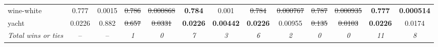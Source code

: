 \begin{tabular}{l|cc|cc|cc|cc|cc|cc}
wine-white & 0.777 & 0.0015 & \sout{0.786} & \sout{0.000868} & \textbf{0.784} & 0.001 & \sout{0.784} & \sout{0.000767} & \sout{0.787} & \sout{0.000935} & \textbf{0.777} & \textbf{0.000514} \\
yacht & 0.0226 & 0.882 & \sout{0.657} & \sout{0.0331} & \textbf{0.0226} & \textbf{0.00442} & \textbf{0.0226} & 0.00955 & \sout{0.135} & \sout{0.0103} & \textbf{0.0226} & 0.0174 \\
\textit{{Total wins or ties}} & -- & -- & \textit{1} & \textit{0} & \textit{7} & \textit{3} & \textit{6} & \textit{2} & \textit{0} & \textit{0} & \textit{11} & \textit{8} \\
\bottomrule
\end{tabular}
